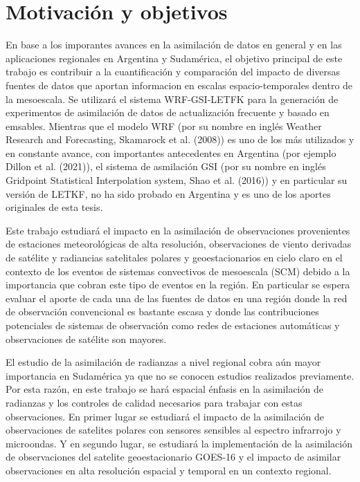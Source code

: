 \documentclass[12pt,twoside]{reedthesis}
\begin{document}
\hypertarget{motivaciuxf3n-y-objetivos}{%
\section{Motivación y objetivos}\label{motivaciuxf3n-y-objetivos}}

En base a los imporantes avances en la asimilación de datos en general y en las aplicaciones regionales en Argentina y Sudamérica, el objetivo principal de este trabajo es contribuir a la cuantificación y comparación del impacto de diversas fuentes de datos que aportan informacion en escalas espacio-temporales dentro de la mesoescala. Se utilizará el sistema WRF-GSI-LETFK para la generación de experimentos de asimilación de datos de actualización frecuente y basado en emsables. Mientras que el modelo WRF (por su nombre en inglés Weather Research and Forecasting, Skamarock et al. (2008)) es uno de los más utilizados y en constante avance, con importantes antecedentes en Argentina (por ejemplo Dillon et al. (2021)), el sistema de asmilación GSI (por su nombre en inglés Gridpoint Statistical Interpolation system, Shao et al. (2016)) y en particular su versión de LETKF, no ha sido probado en Argentina y es uno de los aportes originales de esta tesis.

Este trabajo estudiará el impacto en la asimilación de observaciones provenientes de estaciones meteorológicas de alta resolución, observaciones de viento derivadas de satélite y radiancias satelitales polares y geoestacionarios en cielo claro en el contexto de los eventos de sistemas convectivos de mesoescala (SCM) debido a la importancia que cobran este tipo de eventos en la región. En particular se espera evaluar el aporte de cada una de las fuentes de datos en una región donde la red de observación convencional es bastante escasa y donde las contribuciones potenciales de sistemas de observación como redes de estaciones automáticas y observaciones de satélite son mayores.

El estudio de la asimilación de radianzas a nivel regional cobra aún mayor importancia en Sudamérica ya que no se conocen estudios realizados previamente. Por esta razón, en este trabajo se hará espacial énfasis en la asimilación de radianzas y los controles de calidad necesarios para trabajar con estas observaciones. En primer lugar se estudiará el impacto de la asimilación de observaciones de satelites polares con sensores sensibles al espectro infrarrojo y microondas. Y en segundo lugar, se estudiará la implementación de la asimilación de observaciones del satelite geoestacionario GOES-16 y el impacto de asimilar observaciones en alta resolución espacial y temporal en un contexto regional.
\end{document}
